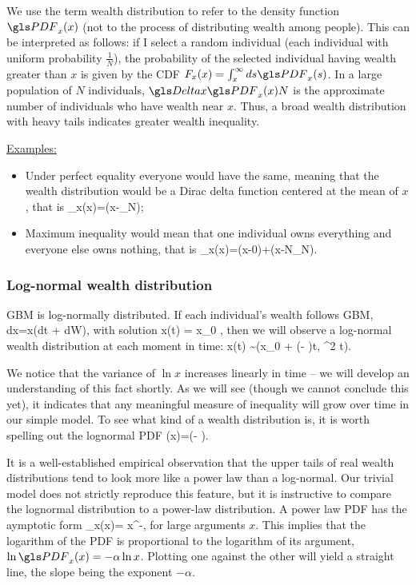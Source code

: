 We use the term wealth distribution to refer to the density function 
$\PDF_x(x)$ (not to the process of distributing wealth among people). This can be 
interpreted as follows: if I select a random individual (each individual with uniform probability 
$\frac{1}{N}$), the probability of the selected individual 
having wealth greater than $x$ is given by the CDF $F_x(x)=\int_x^\infty ds \PDF_x(s)$.
In a large population of $N$ individuals, $\D x \PDF_x(x)N$ is the approximate 
number of individuals who have wealth near $x$. 
Thus, a broad wealth distribution with heavy tails indicates greater wealth inequality. 

\underline{Examples:}
\begin{itemize}
\item Under perfect equality everyone would have the same, meaning that the wealth
distribution would be a Dirac delta function centered at the mean of $x$, that is
\be
\PDF_x(x)=\delta(x-_N);
\ee
\item
Maximum inequality would mean that one individual owns everything
and everyone else owns nothing, that is
\be 
\PDF_x(x)=\delta(x-0)+\delta(x-N_N).
\ee
\end{itemize}

\subsubsection{Log-normal wealth distribution}
GBM is log-normally distributed. If each individual's wealth follows GBM,
\be
dx=x(\mu dt + \sigma dW),
\ee
with solution 
\be
x(t) = x_0 \exp{},
\ee
then we will observe a log-normal wealth distribution at each moment in time:
\be
\ln x(t) \sim {}\left(\ln x_0 + \left(\mu - \right)t, \sigma^2 t\right).
\ee


We notice that the variance of $\ln x$ increases linearly in time -- 
we will develop an understanding of this fact shortly. As we will see 
(though we cannot conclude this yet), it indicates that any meaningful 
measure of inequality will grow over time in our simple model. 
To see what kind of a wealth distribution  is, it is worth 
spelling out the lognormal PDF
\be
\PDF(x)=\exp\left(- \right).
\ee

It is a well-established empirical observation \cite{Newman2005} that the upper tails of 
real wealth distributions tend to look more like a power law than a log-normal. Our trivial model does not
strictly reproduce this feature, but it is instructive to compare the lognormal distribution
to a power-law distribution. A power law PDF has the aymptotic form 
\be
\PDF_x(x)= x^{-\alpha},
\ee
for large arguments $x$. This implies that the logarithm of the PDF is proportional 
to the logarithm of its argument, $\ln \PDF_x(x) = -\alpha \ln x$. Plotting
one against the other will yield a straight line, the slope being the exponent $-\alpha$. 

